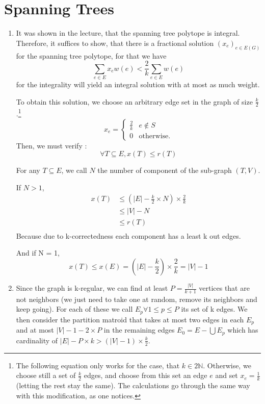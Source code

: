 \documentclass{scrartcl}
\newcommand\1{\mathbf{1}}
\begin{document}
\section{Spanning Trees}
\begin{enumerate}
\item
It was shown in the lecture, that the spanning tree polytope is integral. Therefore, it suffices to show, that there is a fractional solution $(x_e)_{e \in E(G)}$ for the spanning tree polytope, for that we have
\[
\sum_{e \in E} x_e w(e) < \frac{2}{k} \sum_{e \in E} w(e)
\]
for the integrality will yield an integral solution with at most as much weight.

To obtain this solution, we choose an arbitrary edge set in the graph of size $\frac{k}{2}$.\footnote{The following equation only works for the case, that $k\in 2\mathbb{N}$. Otherwise, we choose still a set of $\frac{k}{2}$ edges, and choose from this set an edge $e$ and set $x_e = \frac{1}{k}$ (letting the rest stay the same). The calculations go through the same way with this modification, as one notices.}
\[
x_e = \begin{cases} \frac{2}{k} & e \notin S \\ 0 &\text{otherwise.}\end{cases}
\]
Then, we must verify :
\[
\forall T \subseteq E, x(T) \leq r(T)
\]

For any $T\subseteq E$, we call $N$ the number of component of the sub-graph $(T,V)$.

If $N > 1$,
\begin{align*}
x(T) &\leq (|E| - \frac{k}{2} \times N ) \times\frac{2}{k} \\
&\leq |V| - N \\
&\leq r(T) \\
\end{align*}
Because due to k-correctedness each component has a least k out edges.

And if N = 1,
\[
x(T) \leq x(E) = (|E| - \frac{k}{2}) \times \frac{2}{k} = |V| - 1
\]
\item
Since the graph is k-regular, we can find at least $P = \frac{|V|}{k+1}$ vertices that are not neighbors (we just need to take one at random, remove its neighbors and keep going). For each of these we call $E_p \forall 1 \leq p \leq P$ its set of k edges. We then consider the partition matroid that takes at most two edges in each $E_p$ and at most $|V| - 1 - 2 \times P$ in the remaining edges $E_0 = E-\bigcup E_p$ which has cardinality of $|E| - P \times k > (|V| - 1) \times \frac{k}{2}$.


\end{enumerate}
\end{document}
